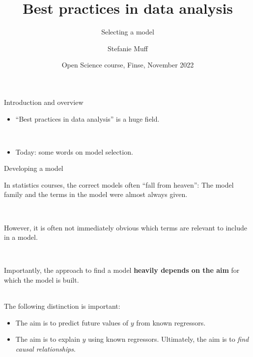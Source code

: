 \documentclass[
  10pt,
  ignorenonframetext,
]{beamer}
\title{Best practices in data analysis}
\subtitle{Selecting a model}
\author{Stefanie Muff}
\date{Open Science course, Finse, November 2022}
\providecommand{\tightlist}{%
  \setlength{\itemsep}{0pt}\setlength{\parskip}{0pt}}
\begin{document}
\frame{\titlepage}

\begin{frame}
\begin{block}{Introduction and overview}
\protect\hypertarget{introduction-and-overview}{}
\(~\)

\begin{itemize}
\tightlist
\item
  ``Best practices in data analysis'' is a huge field.
\end{itemize}

\(~\)

\begin{itemize}
\tightlist
\item
  Today: some words on model selection.
\end{itemize}
\end{block}
\end{frame}

\begin{frame}
\begin{block}{Developing a model}
\protect\hypertarget{developing-a-model}{}
\(~\)

In statistics courses, the correct models often ``fall from heaven'':
The model family and the terms in the model were almost always given.

\(~\)

However, it is often not immediately obvious which terms are relevant to
include in a model.

\(~\)

Importantly, the approach to find a model \textbf{heavily depends on the
aim} for which the model is built.\\
\(~\)

The following distinction is important:

\begin{itemize}
\tightlist
\item
  The aim is to \alert{predict} future values of \(y\) from known
  regressors.
\item
  The aim is to \alert{explain} \(y\) using known regressors.
  Ultimately, the aim is to \emph{find causal relationships}.
\end{itemize}
\end{block}
\end{frame}
\end{document}
